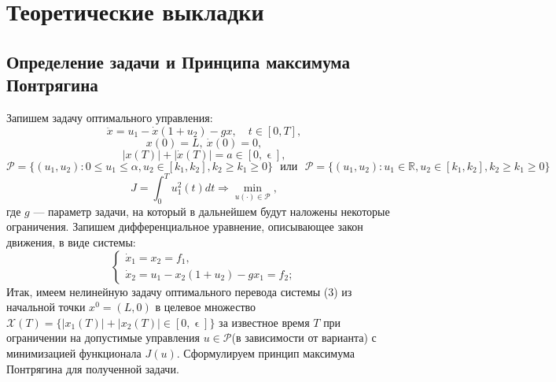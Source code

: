 \documentclass[11pt]{article}
\begin{document}
	\newpage
	
	{\vspace*{-2cm} \hspace*{-1cm}\section{Теоретические выкладки}}
	{\subsection{Определение задачи и Принципа максимума Понтрягина}}
	{Запишем задачу оптимального управления:}
	\[ \ddot{x} = u_1 - \dot{x}(1 + u_2) - gx, \quad t \in [0, T],  \]
	\[ x(0) = L, \ \dot{x}(0) = 0, \]
	\[ |x(T)| + |\dot{x}(T)| = a \in [0, \upvarepsilon],  \]
	\[ \mathcal{P} =  \{ (u_1,u_2): 0 \leq u_1 \leq \alpha, u_2 \in[k_1,k_2],k_2 \geq k_1 \geq 0 \} \ \ \ \text{или} \ \ \  \mathcal{P} = \{(u_1,u_2): u_1 \in \mathbb{R}, u_2 \in [k_1,k_2], k_2 \geq k_1 \geq 0 \} \]
	\[ J = \int_{0}^{T} u_1^2(t)dt \Rightarrow \underset{u(\cdot) \in \mathcal{P}}{\min}, \]
	{где $g$ --- параметр задачи, на который в дальнейшем будут наложены некоторые ограничения. Запишем дифференциальное уравнение, описывающее закон движения, в виде системы:}
	\begin{equation}
	\begin{cases}
		\dot{x}_1 = x_2 = f_1, \\
		\dot{x}_2 = u_1 - x_2(1 + u_2) - gx_1 = f_2;
	\end{cases}
	\end{equation}
	{Итак, имеем нелинейную задачу оптимального перевода системы (3) из начальной точки $x^0 = (L,0)$ в целевое множество $\mathcal{X}(T) = \{ |x_1(T)| + |x_2(T)| \in [0, \upvarepsilon] \}$ за известное время $T$ при ограничении на допустимые управления $u \in \mathcal{P}$(в зависимости от варианта) с минимизацией функционала $J(u)$. Сформулируем принцип максимума Понтрягина для полученной задачи.}
	\newtheorem{theorem}{Теорема}
\end{document}
